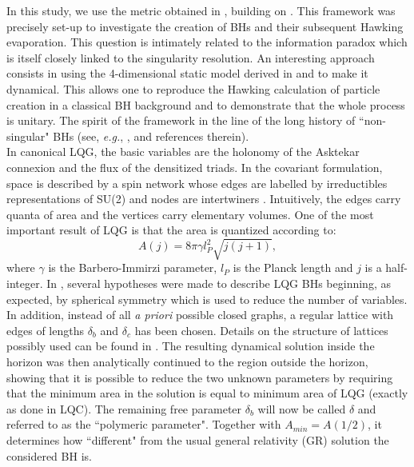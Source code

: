 \documentclass[twocolumn,amsmath,amssymb,prl,10pt,nofootinbib,superscriptaddress]{revtex4}
\begin{document}
In this study, we use the metric obtained in \cite{Alesci:2011wn}, building on \cite{Modesto:2008im}. This framework was precisely set-up to investigate the creation of BHs and their subsequent Hawking evaporation. This question is intimately related to the information paradox which is itself closely linked to the singularity resolution. An interesting approach consists in using the 4-dimensional static model derived in \cite{Modesto:2008im} and to make it dynamical. This allows one to reproduce the Hawking calculation of particle creation in a classical BH background and to demonstrate that the whole process is unitary. The spirit of the framework in the line of the long history of ``non-singular" BHs (see, {\it e.g.}, \cite{Frolov:1989pf,Balbinot:1991qda,Hayward:2005gi,Spallucci:2009zz}, and references therein).\\

In canonical LQG, the basic variables are the holonomy of the Asktekar connexion and the flux of the densitized triads. In the covariant formulation, space is described by a spin network whose edges are labelled by irreductibles representations of SU(2) and nodes are intertwiners \cite{lqg3}. Intuitively, the edges carry quanta of area and the vertices carry elementary volumes. One of the most important result of LQG is that the area is quantized according to:
\begin{equation}
A(j)=8\pi\gamma l_P^2\sqrt{j(j+1)},
\label{area}
\end{equation}
where $\gamma$ is the Barbero-Immirzi parameter, $l_P$ is the Planck length and $j$ is a half-integer. In \cite{Alesci:2011wn}, several hypotheses were made to describe LQG BHs beginning, as expected, by spherical symmetry which is used to reduce the number of variables. In addition, instead of all {\it a priori} possible closed graphs, a regular lattice with edges of lengths $\delta_b$  and $\delta_c$ has been chosen. Details on the structure of lattices possibly used can be found in \cite{Alesci:2015nja}. The resulting dynamical solution inside the horizon was then analytically continued to the region outside the horizon, showing that it is possible to reduce the two unknown parameters by requiring that the minimum area in the solution is equal to minimum area of LQG (exactly as done in LQC). The remaining free parameter $\delta_b$ will now be called $\delta$ and referred to as the ``polymeric parameter". Together with $A_{min}=A(1/2)$, it determines how ``different" from the usual general relativity (GR) solution the considered BH is. \\
\end{document}
